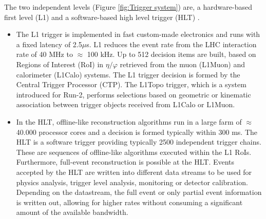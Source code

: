 \documentclass[a4paper, oneside]{book}
\begin{document}
					The two independent levels (Figure \ref{fig:Trigger system}) are, a hardware-based first level (L1) and a software-based high level trigger (HLT) \cite{Trigger system}. 
					\begin{itemize}
						\item The L1 trigger is implemented in fast custom-made electronics and runs with a fixed latency of 2.5$\mu$s. L1 reduces the event rate from the LHC interaction rate of 40 MHz to $\approx$ 100 kHz. Up to 512 decision items are built, based on Regions of Interest (RoI) in $\eta/\varphi$ retrieved from the muon (L1Muon) and calorimeter (L1Calo) systems. The L1 trigger decision is formed by the Central Trigger Processor (CTP). The L1Topo trigger, which is a system introduced for Run-2, performs selections based on geometric or kinematic association between trigger objects received from L1Calo or L1Muon. 
						
						\item In the HLT, offline-like reconstruction algorithms run in a large farm of $\approx$ 40.000 processor cores and a decision is formed typically within 300 ms. The HLT is a software trigger providing typically 2500 independent trigger chains. These are sequences of offline-like algorithms executed within the L1 RoIs. Furthermore, full-event reconstruction is possible at the HLT. Events accepted by the HLT are written into different data streams to be used for physics analysis, trigger level analysis, monitoring or detector calibration. Depending on the datastream, the full event or only partial event information is written out, allowing for higher rates without consuming a significant amount of the available bandwidth.
					\end{itemize}
					
\end{document}
